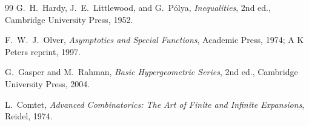 \documentclass[11pt,a4paper]{article}
\theoremstyle{definition}
\begin{document}
\begin{thebibliography}{99}
G.~H.~Hardy, J.~E.~Littlewood, and G.~P\'olya,
\newblock \emph{Inequalities},
\newblock 2nd ed., Cambridge University Press, 1952.

F.~W.~J.~Olver,
\newblock \emph{Asymptotics and Special Functions},
\newblock Academic Press, 1974; A K Peters reprint, 1997.

G.~Gasper and M.~Rahman,
\newblock \emph{Basic Hypergeometric Series},
\newblock 2nd ed., Cambridge University Press, 2004.

L.~Comtet,
\newblock \emph{Advanced Combinatorics: The Art of Finite and Infinite
Expansions},
\newblock Reidel, 1974.

\end{thebibliography}
\end{document}
